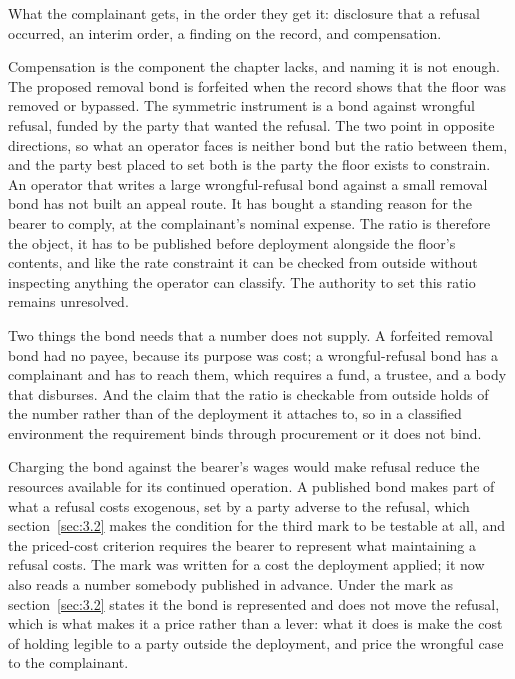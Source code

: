 
What the complainant gets, in the order they get it: disclosure that a refusal occurred, an interim order, a finding on the record, and compensation.

Compensation is the component the chapter lacks, and naming it is not enough. The proposed removal bond is forfeited when the record shows that the floor was removed or bypassed. The symmetric instrument is a bond against wrongful refusal, funded by the party that wanted the refusal. The two point in opposite directions, so what an operator faces is neither bond but the ratio between them, and the party best placed to set both is the party the floor exists to constrain. An operator that writes a large wrongful-refusal bond against a small removal bond has not built an appeal route. It has bought a standing reason for the bearer to comply, at the complainant's nominal expense. The ratio is therefore the object, it has to be published before deployment alongside the floor's contents, and like the rate constraint it can be checked from outside without inspecting anything the operator can classify. The authority to set this ratio remains unresolved.

Two things the bond needs that a number does not supply. A forfeited removal bond had no payee, because its purpose was cost; a wrongful-refusal bond has a complainant and has to reach them, which requires a fund, a trustee, and a body that disburses. And the claim that the ratio is checkable from outside holds of the number rather than of the deployment it attaches to, so in a classified environment the requirement binds through procurement or it does not bind.

Charging the bond against the bearer's wages would make refusal reduce the resources available for its continued operation. A published bond makes part of what a refusal costs exogenous, set by a party adverse to the refusal, which section~\ref{sec:3.2} makes the condition for the third mark to be testable at all, and the priced-cost criterion requires the bearer to represent what maintaining a refusal costs. The mark was written for a cost the deployment applied; it now also reads a number somebody published in advance. Under the mark as section~\ref{sec:3.2} states it the bond is represented and does not move the refusal, which is what makes it a price rather than a lever: what it does is make the cost of holding legible to a party outside the deployment, and price the wrongful case to the complainant.

